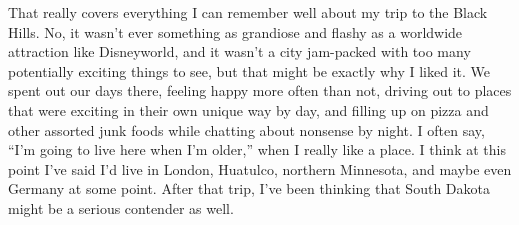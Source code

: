 \documentclass[12pt]{article}
\begin{document}
That really covers everything I can remember well about my trip to the Black Hills.  No, it wasn't ever something as grandiose and flashy as a worldwide attraction like Disneyworld, and it wasn't a city jam-packed with too many potentially exciting things to see, but that might be exactly why I liked it.  We spent out our days there, feeling happy more often than not, driving out to places that were exciting in their own unique way by day, and filling up on pizza and other assorted junk foods while chatting about nonsense by night.  I often say, ``I'm going to live here when I'm older,'' when I really like a place.  I think at this point I've said I'd live in London, Huatulco, northern Minnesota, and maybe even Germany at some point.  After that trip, I've been thinking that South Dakota might be a serious contender as well.
\end{document}
